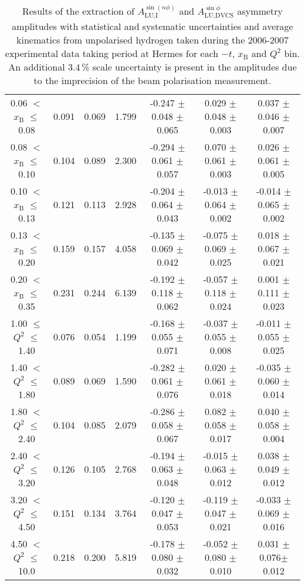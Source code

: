\begin{table}[width=15cm]
\begin{center}
{\begin{tabular}{|c|c|c|c|c|c|c|}
0.06 $<$ $x_{\textrm{B}}$ $\leqslant$ 0.08 &  0.091 & 0.069 &  1.799 &  -0.247  $\pm$  0.048  $\pm$   0.065 &
0.029 $\pm$  0.048  $\pm$   0.003 & 0.037 $\pm$   0.046  $\pm$   0.007\\
0.08 $<$ $x_{\textrm{B}}$ $\leqslant$ 0.10 &  0.104 & 0.089 &  2.300 &  -0.294 $\pm$  0.061  $\pm$   0.057 &
0.070 $\pm$   0.061  $\pm$   0.003 & 0.026  $\pm$  0.061  $\pm$   0.005\\
0.10 $<$ $x_{\textrm{B}}$ $\leqslant$ 0.13 &  0.121 &  0.113 &  2.928 &  -0.204  $\pm$  0.064   $\pm$  0.043 & 
-0.013  $\pm$  0.064  $\pm$   0.002 & -0.014  $\pm$  0.065  $\pm$   0.002\\
0.13 $<$ $x_{\textrm{B}}$ $\leqslant$ 0.20 &  0.159 & 0.157 &  4.058&  -0.135  $\pm$  0.069  $\pm$   0.042 &
-0.075  $\pm$  0.069  $\pm$   0.025 & 0.018  $\pm$  0.067  $\pm$   0.021 \\
0.20 $<$ $x_{\textrm{B}}$ $\leqslant$ 0.35 &  0.231 & 0.244 &  6.139 &  -0.192 $\pm$ 0.118  $\pm$   0.062 &
-0.057  $\pm$  0.118 $\pm$    0.024 & 0.001  $\pm$  0.111  $\pm$  0.023\\
\hline
1.00 $\leqslant$ $Q^{2}$ $\leqslant$ 1.40 &  0.076 & 0.054  & 1.199 &  -0.168  $\pm$  0.055  $\pm$   0.071 &
-0.037 $\pm$   0.055  $\pm$   0.008 & -0.011  $\pm$  0.055   $\pm$  0.025 \\
1.40 $<$ $Q^{2}$ $\leqslant$ 1.80 &  0.089 & 0.069 &  1.590 &  -0.282 $\pm$  0.061  $\pm$   0.076 &
0.020  $\pm$  0.061  $\pm$   0.018 & -0.035 $\pm$   0.060  $\pm$   0.014\\
1.80 $<$ $Q^{2}$ $\leqslant$ 2.40 &  0.104 & 0.085 &  2.079 &  -0.286 $\pm$   0.058  $\pm$   0.067 &
0.082 $\pm$   0.058  $\pm$   0.017 & 0.040  $\pm$  0.058  $\pm$   0.004\\
2.40 $<$ $Q^{2}$ $\leqslant$ 3.20 &  0.126 & 0.105  & 2.768 &  -0.194 $\pm$   0.063  $\pm$   0.048 &
-0.015  $\pm$  0.063 $\pm$    0.012 & 0.038   $\pm$ 0.049  $\pm$   0.012\\
3.20 $<$ $Q^{2}$ $\leqslant$ 4.50 &  0.151 & 0.134 &  3.764 &  -0.120 $\pm$   0.047  $\pm$   0.053 &
-0.119  $\pm$  0.047 $\pm$    0.021 & -0.033 $\pm$   0.069  $\pm$   0.016\\
4.50 $<$ $Q^{2}$ $\leqslant$ 10.0 &  0.218 & 0.200 &  5.819 &  -0.178  $\pm$  0.080 $\pm$    0.032 &
-0.052  $\pm$  0.080  $\pm$   0.010 & 0.031 $\pm$  0.076$ \pm$  0.012\\
\hline
  \end{tabular}
}
 \end{center}
\caption{Results of the extraction of $A_{\textrm{LU,I}}^{\sin(n\phi)}$ and $A_{\textrm{LU,DVCS}}^{\sin \phi}$ asymmetry amplitudes with statistical and systematic uncertainties and average kinematics from unpolarised hydrogen taken during
the 2006-2007 experimental data taking period at H{\sc ermes} for each $-t$, $x_{\textrm{B}}$ and $Q^{2}$ bin.
An additional 3.4\,\% scale uncertainty is present in the amplitudes due to the imprecision of
the beam polarisation measurement.}
\end{table}


